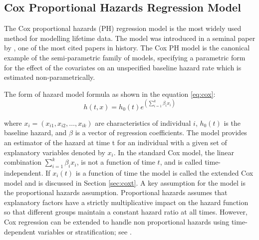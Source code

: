 \documentclass[12pt,letterpaper]{article}
\begin{document}


\subsection{Cox Proportional Hazards Regression Model}
The Cox proportional hazards (PH) regression model is the most widely used method for modelling lifetime data. The model was introduced in a seminal paper by \citet{cox1972}, one of the most cited papers in history. The Cox PH model is the canonical example of the semi-parametric family of models, specifying a parametric form for the effect of the covariates on an unspecified baseline hazard rate which is estimated non-parametrically.

The form of hazard model formula as shown in the equation \ref{eq:cox}:
\begin{equation}
	\label{eq:cox}
	h(t,x)=h_0(t)e^{(\sum_{i=1}^{k}\beta_ix_i)}
\end{equation}

where $x_i=(x_{i1}, x_{i2}, \ldots, x_{ik})$ are characteristics of individual $i$, $h_0(t)$ is the baseline hazard, and $\beta$  is a vector of regression coefficients.
The model provides an estimator of the hazard at time t for an individual with a given set of explanatory variables denoted by $x_i$.  In the standard Cox model, the linear combination $\sum_{i=1}^{k}\beta_i x_i$, is not a function of time $t$, and is called time-independent.  If $x_i(t)$ is a function of time the model is called the extended Cox model and is discussed in Section \ref{sec:coxt}. A key assumption for the model is the proportional hazards assumption. Proportional hazards assumes that explanatory factors have a strictly multiplicative impact on the hazard function so that different groups maintain a constant hazard ratio at all times. However, Cox regression can be extended to handle non proportional hazards using time-dependent variables or stratification; see \cite{kleinMosch2003}.
\end{document}
